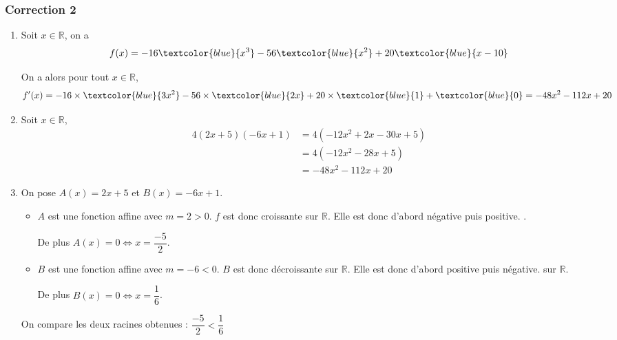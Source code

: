 \documentclass[15pt, mathserif]{beamer}
\newcommand{\R}{\mathbb{R}}			%
\begin{document}
\begin{frame}
\vspace{-10mm}
	\frametitle{Correction 2}
\begin{enumerate} 
 	 \item Soit $x \in \R$, on a $$f(x)=-16\textcolor{blue}{x^3}-56\textcolor{blue}{x^2}+20\textcolor{blue}{x-10}$$
 
 On a alors pour tout $x \in  \R$, $$f'(x)= -16\times \textcolor{blue}{3x^2} -56\times \textcolor{blue}{2x}+20\times \textcolor{blue}{1}+\textcolor{blue}{0}=-48x^2-112x+20$$
 	 \item Soit $x \in \R$, \begin{align*} 
 4(2x+5)(-6x+1) & = 4\left( -12x^2 +2x -30x +5\right) \\ 
 &=  4\left( -12x^2 -28x +5\right) \\ 
 &= -48x^2 -112x +20
 \end{align*} \end{enumerate} 
 
 \end{frame} 
 
 \begin{frame} 
 
 \begin{enumerate} 
 \setcounter{enumi}{2} 
 
 	 \item On pose $A(x)= 2x+5$ et $B(x) = -6x+1$.
 \bigskip 
 \begin{itemize}
	\item $A$ est une fonction affine avec $m =2>0$. $f$ est donc croissante sur $\mathbb{R}$. Elle est donc d'abord négative puis positive. .

	 De plus $A(x) = 0 \Leftrightarrow x = \dfrac{-5}{2}$. 
 \bigskip 
	\item $B$ est une fonction affine avec $m =-6<0$. $B$ est donc décroissante sur $\mathbb{R}$. Elle est donc d'abord positive puis négative. sur $\mathbb{R}$.

	 De plus $B(x) = 0 \Leftrightarrow x = \dfrac{1}{6}$.
\end{itemize}
 On compare les deux racines obtenues : $ \dfrac{-5}{2} < \dfrac{1}{6}$ 
 \end{enumerate} 
 
 \end{frame}
\end{document}
